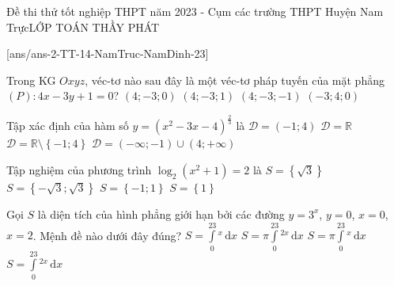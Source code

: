\begin{name}
	{\tenchude}{Đề thi thử tốt nghiệp THPT năm 2023 - Cụm các trường THPT Huyện Nam Trực}{LỚP TOÁN THẦY PHÁT}{\thoigian}	
\end{name}
\setcounter{ex}{0}\setcounter{bt}{0}
[ans/ans-2-TT-14-NamTruc-NamDinh-23]
\begin{ex}%
	Trong KG $Oxyz$, véc-tơ nào sau đây là một véc-tơ pháp tuyến của mặt phẳng $(P)\colon 4x-3y+1=0$?
	\choice
	{\True $\left(4;-3;0\right)$}
	{$\left(4;-3;1\right)$}
	{$\left(4;-3;-1\right)$}
	{$\left(-3;4;0\right)$}
\end{ex}
\begin{ex}%
	Tập xác định của hàm số $y=\left(x^2-3x-4\right)^{\tfrac{2}{3}}$ là
	\choice
	{$\mathscr{D}=\left(-1;4\right)$}
	{$\mathscr{D}=\mathbb{R}$}
	{$\mathscr{D}=\mathbb{R}\setminus\left\lbrace -1;4\right\rbrace $}
	{\True $\mathscr{D}=\left(-\infty;-1\right)\cup\left(4;+\infty\right)$}
\end{ex}
\begin{ex}%
	Tập nghiệm của phương trình $\log_2\left(x^2+1\right)=2$ là
	\choice
	{$S=\left\lbrace \sqrt{3}\right\rbrace $}
	{\True $S=\left\lbrace -\sqrt{3};\sqrt{3}\right\rbrace $}
	{$S=\left\lbrace -1;1\right\rbrace $}
	{$S=\left\lbrace 1\right\rbrace $}
\end{ex}
\begin{ex}%
Gọi $S$ là diện tích của hình phẳng giới hạn bởi các đường $y=3^x$, $y=0$, $x=0$, $x=2$. Mệnh đề nào dưới đây đúng?
\choice
{\True $S=\displaystyle\int\limits_0^23^x\mathrm{\,d}x$}
{$S=\pi\displaystyle\int\limits_0^23^{2x}\mathrm{\,d}x$}
{$S=\pi\displaystyle\int\limits_0^23^x\mathrm{\,d}x$}
{$S=\displaystyle\int\limits_0^23^{2x}\mathrm{\,d}x$}
\end{ex}
